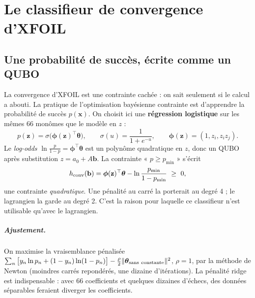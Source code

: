 \chapter{Le classifieur de convergence d'XFOIL}\label{ch:classifieur}

\section{Une probabilité de succès, écrite comme un QUBO}
La convergence d'XFOIL est une contrainte cachée : on sait seulement si le calcul a abouti. La pratique de l'optimisation bayésienne contrainte est d'apprendre la probabilité de succès $p(\mathbf x)$. On choisit ici une \textbf{régression logistique} sur les mêmes 66 monômes que le modèle en $z$ :
\[ p(\mathbf z)=\sigma\big(\boldsymbol\phi(\mathbf z)^\top\boldsymbol\theta\big),\qquad\sigma(u)=\frac1{1+e^{-u}},\qquad\boldsymbol\phi(\mathbf z)=(1,z_i,z_iz_j). \]
Le \emph{log-odds} $\ln\frac p{1-p}=\boldsymbol\phi^\top\boldsymbol\theta$ est un polynôme quadratique en $z$, donc un QUBO après substitution $z=a_0+A\mathbf b$. La contrainte « $p\ge p_{\min}$ » s'écrit
\[ h_{\rm conv}(\mathbf b)=\boldsymbol\phi(\mathbf z)^\top\boldsymbol\theta-\ln\frac{p_{\min}}{1-p_{\min}}\ \ge\ 0, \]
une contrainte \emph{quadratique}. Une pénalité au carré la porterait au degré 4 ; le lagrangien la garde au degré 2. C'est la raison pour laquelle ce classifieur n'est utilisable qu'avec le lagrangien.

\paragraph{Ajustement.} On maximise la vraisemblance pénalisée $\sum_n\big[y_n\ln p_n+(1-y_n)\ln(1-p_n)\big]-\tfrac{\rho}2\|\boldsymbol\theta_{\rm sans\ constante}\|^2$, $\rho=1$, par la méthode de Newton (moindres carrés repondérés, une dizaine d'itérations). La pénalité ridge est indispensable : avec 66 coefficients et quelques dizaines d'échecs, des données séparables feraient diverger les coefficients.

